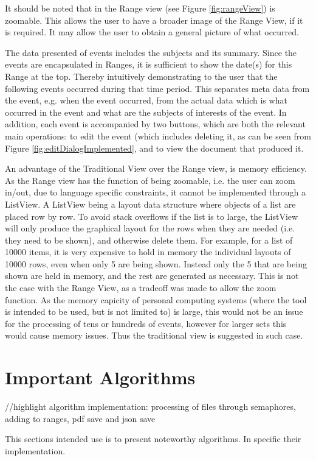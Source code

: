 \par It should be noted that in the Range view (see Figure \ref{fig:rangeView}) is zoomable. This allows the user to have a broader image of the Range View, if it is required. It may allow the user to obtain a general picture of what occurred.
\par The data presented of events includes the subjects and its summary. Since the events are encapsulated in Ranges, it is sufficient to show the date(s) for this Range at the top. Thereby intuitively demonstrating to the user that the following events occurred during that time period. This separates meta data from the event, e.g. when the event occurred, from the actual data which is what occurred in the event and what are the subjects of interests of the event. In addition, each event is accompanied by two buttons, which are both the relevant main operations: to edit the event (which includes deleting it, as can be seen from Figure \ref{fig:editDialogImplemented}, and to view the document that produced it.
\par An advantage of the Traditional View over the Range view, is memory efficiency. As the Range view has the function of being zoomable, i.e. the user can zoom in/out, due to language specific constraints, it cannot be implemented through a ListView. A ListView being a layout data structure where objects of a list are placed row by row. To avoid stack overflows if the list is to large, the ListView will only produce the graphical layout for the rows when they are needed (i.e. they need to be shown), and otherwise delete them. For example, for a list of 10000 items, it is very expensive to hold in memory the individual layouts of 10000 rows, even when only 5 are being shown. Instead only the 5 that are being shown are held in memory, and the rest are generated as necessary. This is not the case with the Range View, as a tradeoff was made to allow the zoom function. As the memory capicity of personal computing systems (where the tool is intended to be used, but is not limited to) is large, this would not be an issue for the processing of tens or hundreds of events, however for larger sets this would cause memory issues. Thus the traditional view is suggested in such case.
\section{Important Algorithms}
//highlight algorithm implementation: processing of files through semaphores, adding to ranges, pdf save and json save
\par This sections intended use is to present noteworthy algorithms. In specific their implementation.
